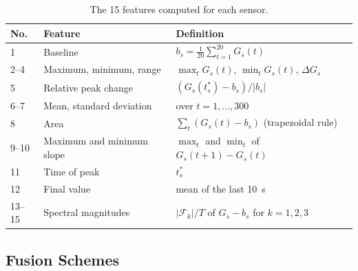 \documentclass[12pt]{article}
\begin{document}
\begin{table}[!htbp]
\centering
\caption[Features computed for each sensor]{The 15 features computed for each sensor.}
\label{tab:features}
\footnotesize
\begin{tabular}{lll}
\toprule
\textbf{No.} & \textbf{Feature} & \textbf{Definition} \\
\midrule
1 & Baseline & $b_s = \frac{1}{20}\sum_{t=1}^{20} G_s(t)$ \\
2--4 & Maximum, minimum, range & $\max_t G_s(t)$, $\min_t G_s(t)$, $\Delta G_s$ \\
5 & Relative peak change & $(G_s(t^{*}_s) - b_s)/|b_s|$ \\
6--7 & Mean, standard deviation & over $t = 1, \dots, 300$ \\
8 & Area & $\sum_t (G_s(t) - b_s)$ (trapezoidal rule) \\
9--10 & Maximum and minimum slope & $\max_t$ and $\min_t$ of $G_s(t+1) - G_s(t)$ \\
11 & Time of peak & $t^{*}_s$ \\
12 & Final value & mean of the last 10~s \\
13--15 & Spectral magnitudes & $|\mathcal{F}_k|/T$ of $G_s - b_s$ for $k = 1, 2, 3$ \\
\bottomrule
\end{tabular}
\end{table}

\subsection{Fusion Schemes}
\end{document}
